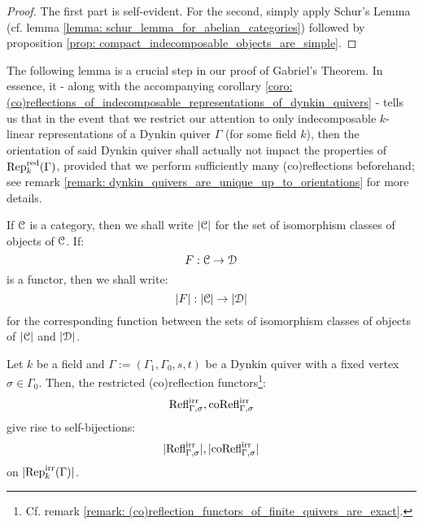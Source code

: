                 \begin{proof}
                    The first part is self-evident. For the second, simply apply Schur's Lemma (cf. lemma \ref{lemma: schur_lemma_for_abelian_categories}) followed by proposition \ref{prop: compact_indecomposable_objects_are_simple}.
                \end{proof}
                
            The following lemma is a crucial step in our proof of Gabriel's Theorem. In essence, it - along with the accompanying corollary \ref{coro: (co)reflections_of_indecomposable_representations_of_dynkin_quivers} - tells us that in the event that we restrict our attention to only indecomposable $k$-linear representations of a Dynkin quiver $\Gamma$ (for some field $k$), then the orientation of said Dynkin quiver shall actually not impact the properties of $\mathrm{Rep}_k^{\mathrm{red}}(\Gamma)$, provided that we perform sufficiently many (co)reflections beforehand; see remark \ref{remark: dynkin_quivers_are_unique_up_to_orientations} for more details.
            \begin{convention}
                If $\mathcal{C}$ is a category, then we shall write $|\mathcal{C}|$ for the set of isomorphism classes of objects of $\mathcal{C}$. If:
                    $$F: \mathcal{C} \to \mathcal{D}$$
                is a functor, then we shall write:
                    $$|F|: |\mathcal{C}| \to |\mathcal{D}|$$
                for the corresponding function between the sets of isomorphism classes of objects of $|\mathcal{C}|$ and $|\mathcal{D}|$.
            \end{convention}
            \begin{remark} \label{remark: (co)reflection_functors_as_adjoints_to_the_constant_functor}
                
            \end{remark}
            \begin{lemma} \label{lemma: (co)reflections_of_irreducible_representations_of_dynkin_quivers_are_self_bijections_on_isomorphism_classes_of_objects}
                Let $k$ be a field and $\Gamma := (\Gamma_1, \Gamma_0, s, t)$ be a Dynkin quiver with a fixed vertex $\sigma \in \Gamma_0$. Then, the restricted (co)reflection functors\footnote{Cf. remark \ref{remark: (co)reflection_functors_of_finite_quivers_are_exact}.}:
                    $$\mathrm{Refl}_{\Gamma, \sigma}^{\mathrm{irr}}, \mathrm{co}\mathrm{Refl}_{\Gamma, \sigma}^{\mathrm{irr}}$$
                give rise to self-bijections:
                    $$|\mathrm{Refl}_{\Gamma, \sigma}^{\mathrm{irr}}|, |\mathrm{co}\mathrm{Refl}_{\Gamma, \sigma}^{\mathrm{irr}}|$$
                on $|\mathrm{Rep}_k^{\mathrm{irr}}(\Gamma)|$.
            \end{lemma}
